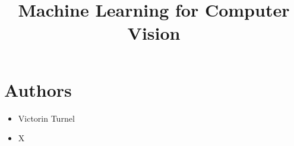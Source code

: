 \documentclass[conference]{IEEEtran}
\title{Machine Learning for Computer Vision}
\begin{document}
	\maketitle
	

	
	\section*{Authors}
	\begin{itemize}
		\item Victorin Turnel
		\item X
	\end{itemize}
	\vspace{0.5cm}
	
	
	
	
	
	
	
	
	
	
	
\end{document}
